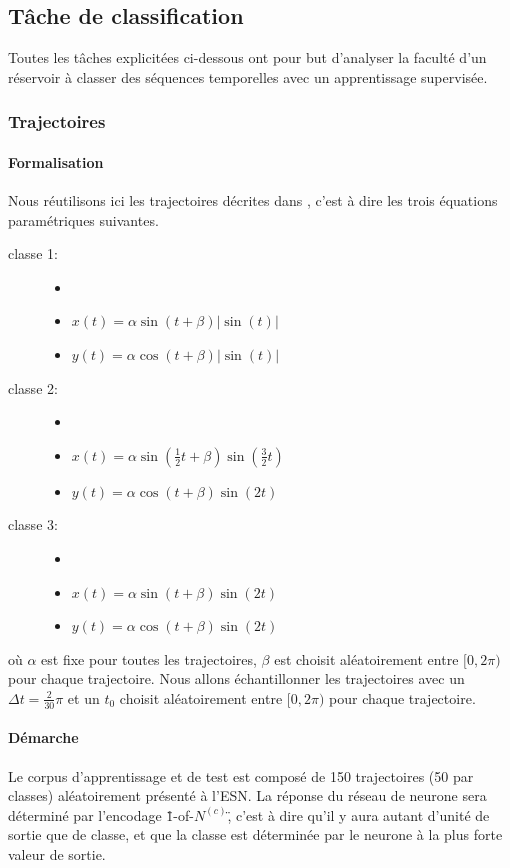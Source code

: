 \documentclass[12pt]{article}
\begin{document}
\subsection{Tâche de classification}

Toutes les tâches explicitées ci-dessous ont pour but d'analyser la faculté d'un réservoir à classer des séquences temporelles avec un apprentissage supervisée.

\subsubsection{Trajectoires}
\paragraph{Formalisation}
Nous réutilisons ici les trajectoires décrites dans \cite{HuskenStagge03}, c'est à dire les trois équations paramétriques suivantes.
\begin{description}
\item[classe 1:]
\begin{itemize}
\item
\item $x(t) = \alpha \sin(t+\beta)|\sin(t)|$
\item $y(t) = \alpha \cos(t+\beta)|\sin(t)|$
\end{itemize}
\item[classe 2:] 
\begin{itemize}
\item
\item $x(t) = \alpha \sin(\frac{1}{2}t+\beta)\sin(\frac{3}{2}t)$
\item $y(t) = \alpha \cos(t+\beta)\sin(2t)$
\end{itemize}
\item[classe 3:] 
\begin{itemize}
\item
\item $x(t) = \alpha \sin(t+\beta)\sin(2t)$
\item $y(t) = \alpha \cos(t+\beta)\sin(2t)$
\end{itemize}
\end{description}
où $\alpha$ est fixe pour toutes les trajectoires, $\beta$ est choisit aléatoirement entre $[0, 2\pi)$ pour chaque trajectoire. Nous allons échantillonner les trajectoires avec un $\Delta t = \frac{2}{30}\pi$ et un $t_0$ choisit aléatoirement entre $[0, 2\pi)$ pour chaque trajectoire.

\paragraph{Démarche}
Le corpus d'apprentissage et de test est composé de 150 trajectoires (50 par classes) aléatoirement présenté à l'ESN. La réponse du réseau de neurone sera déterminé par l'encodage \"1-of-$N^{(c)}$\", c'est à dire qu'il y aura autant d'unité de sortie que de classe, et que la classe est déterminée par le neurone à la plus forte valeur de sortie.
\end{document}
